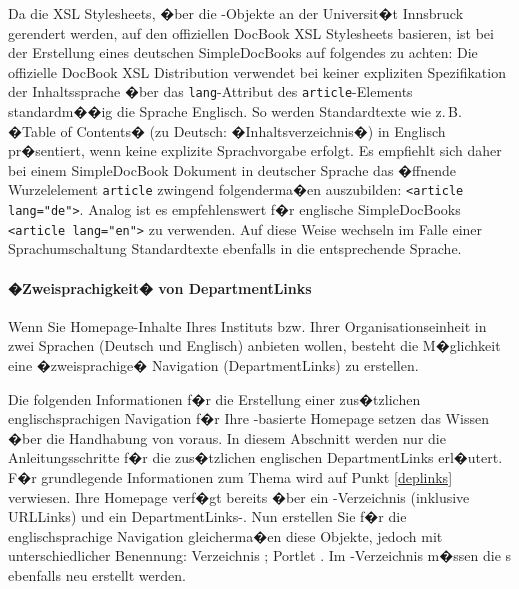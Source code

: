 \begin{Hinweis}
  Da die XSL Stylesheets, �ber die -Objekte an
  der Universit�t Innsbruck gerendert werden, auf den offiziellen
  DocBook XSL Stylesheets basieren, ist bei der Erstellung eines
  deutschen SimpleDocBooks auf folgendes zu achten: Die offizielle
  DocBook XSL Distribution verwendet bei keiner expliziten
  Spezifikation der Inhaltssprache �ber das \texttt{lang}-Attribut des
  \texttt{article}-Elements standardm��ig die Sprache Englisch. So
  werden Standardtexte wie z.\,B. �Table of Contents� (zu Deutsch:
  �Inhaltsverzeichnis�) in Englisch pr�sentiert, wenn keine explizite
  Sprachvorgabe erfolgt. Es empfiehlt sich daher bei einem
  SimpleDocBook Dokument in deutscher Sprache das �ffnende
  Wurzelelement \texttt{article} zwingend folgenderma�en auszubilden:
  \texttt{<article lang="{}de"{}>}. Analog ist es empfehlenswert f�r
  englische SimpleDocBooks \texttt{<article lang="{}en"{}>} zu
  verwenden. Auf diese Weise wechseln im Falle einer Sprachumschaltung
  Standardtexte ebenfalls in die entsprechende Sprache.
\end{Hinweis}

\paragraph{�Zweisprachigkeit� von DepartmentLinks}

Wenn Sie Homepage-Inhalte Ihres Instituts bzw. Ihrer Organisationseinheit in zwei
Sprachen (Deutsch und Englisch) anbieten wollen, besteht die M�glichkeit eine
�zweisprachige� Navigation (DepartmentLinks) zu erstellen.

Die folgenden Informationen f�r die Erstellung einer zus�tzlichen englischsprachigen
Navigation f�r Ihre -basierte Homepage setzen das Wissen �ber die
Handhabung von  voraus. In diesem Abschnitt werden nur die Anleitungsschritte f�r die zus�tzlichen englischen DepartmentLinks erl�utert. F�r 
grundlegende Informationen zum Thema  wird auf Punkt \ref{deplinks} verwiesen.
Ihre Homepage verf�gt bereits �ber ein -Verzeichnis (inklusive
URLLinks) und ein DepartmentLinks-. Nun erstellen Sie f�r die
englischsprachige Navigation gleicherma�en diese Objekte, jedoch mit
unterschiedlicher Benennung: Verzeichnis ; Portlet
. Im -Verzeichnis m�ssen
die s ebenfalls neu erstellt werden. 

